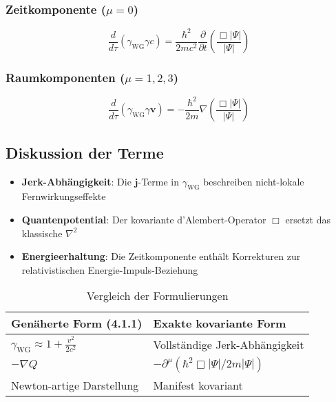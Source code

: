 \subsubsection{Zeitkomponente ($\mu=0$)}
\begin{equation}
\frac{d}{d\tau}\left(\gamma_{\mathrm{WG}}\gamma c\right) = \frac{\hbar^2}{2mc^2}\frac{\partial}{\partial t}\left(\frac{\Box|\Psi|}{|\Psi|}\right)
\end{equation}

\subsubsection{Raumkomponenten ($\mu=1,2,3$)}
\begin{equation}
\frac{d}{d\tau}\left(\gamma_{\mathrm{WG}}\gamma\mathbf{v}\right) = -\frac{\hbar^2}{2m}\nabla\left(\frac{\Box|\Psi|}{|\Psi|}\right)
\end{equation}

\subsection{Diskussion der Terme}
\begin{itemize}
\item \textbf{Jerk-Abhängigkeit}: Die $\mathbf{j}$-Terme in $\gamma_{\mathrm{WG}}$ beschreiben nicht-lokale Fernwirkungseffekte
\item \textbf{Quantenpotential}: Der kovariante d'Alembert-Operator $\Box$ ersetzt das klassische $\nabla^2$
\item \textbf{Energieerhaltung}: Die Zeitkomponente enthält Korrekturen zur relativistischen Energie-Impuls-Beziehung
\end{itemize}

\begin{table}[h]
\centering
\caption{Vergleich der Formulierungen}
\begin{tabular}{ll}
\hline
\textbf{Genäherte Form (4.1.1)} & \textbf{Exakte kovariante Form} \\
\hline
$\gamma_{\mathrm{WG}} \approx 1 + \frac{v^2}{2c^2}$ & Vollständige Jerk-Abhängigkeit \\
$-\nabla Q$ & $-\partial^\mu(\hbar^2\Box|\Psi|/2m|\Psi|)$ \\
Newton-artige Darstellung & Manifest kovariant \\
\hline
\end{tabular}
\end{table}
